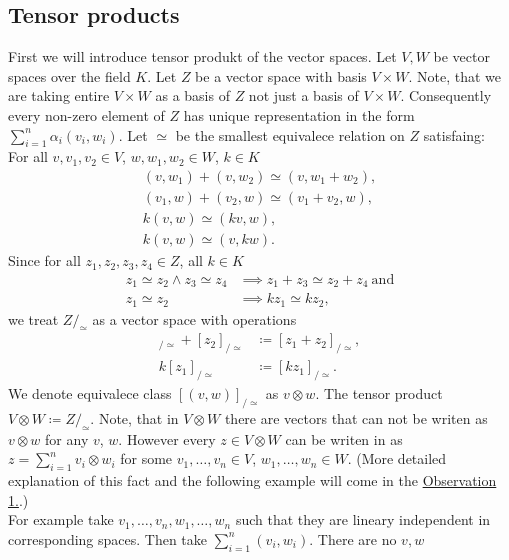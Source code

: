 \documentclass[a4paper]{article}
\begin{document}
\subsection{Tensor products}
%
First we will introduce tensor produkt of the vector spaces. Let $V, W$ be vector spaces over the field $K$.
Let $Z$ be a vector space with basis $V \times W$. Note, that we are taking entire $V \times W$ as a basis
of $Z$ not just a basis of $V \times W$. Consequently every non-zero element of $Z$ has unique
representation in the form
$\displaystyle\sum^n_{i = 1}\alpha_i(v_i,w_i)$.
Let $\simeq$ be the smallest equivalece relation on $Z$ satisfaing: \\
%
For all $v,v_1,v_2 \in V$, $w, w_1, w_2 \in W$, $k \in K$
\begin{gather*}
(v,w_1) + (v, w_2) \simeq (v, w_1 + w_2), \\
(v_1,w) +(v_2, w) \simeq (v_1+v_2,w), \\
k(v, w) \simeq (kv, w), \\
k(v, w) \simeq (v, kw).
\end{gather*}
Since for all $z_1, z_2, z_3, z_4 \in Z$, all $k \in K$
\begin{align*}
z_1 \simeq z_2 \land z_3 \simeq z_4 &\implies z_1 + z_3 \simeq z_2 + z_4 \mathrm{\ and} \\
z_1 \simeq z_2 &\implies kz_1 \simeq kz_2,
\end{align*}
%
we treat $Z/_\simeq$ as a vector space with operations
%
\begin{align*}
[z_1]_{/\simeq} + [z_2]_{/\simeq} &\coloneqq [z_1 + z_2]_{/\simeq}, \\
k[z_1]_{/\simeq} &\coloneqq [kz_1]_{/\simeq}.
\end{align*}
%
We denote equivalece class $[(v,w)]_{/\simeq}$ as $v \otimes w$.
The tensor product $V \otimes W \coloneqq Z/_\simeq$.
Note, that in $V \otimes W$ there are vectors that can not be writen as $v \otimes w$ for any $v$, $w$.
However every $z \in V \otimes W$ can be writen in as $z =\displaystyle\sum^n_{i = 1}v_i \otimes w_i$
for some $v_1, \dots, v_n \in V$, $w_1, \dots, w_n \in W$.
(More detailed explanation of this fact and the following example will come in the
\hyperref[observation:1]{Observation 1.}.)\\
For example take $v_1,\dots, v_n, w_1, \dots, w_n$ such that they are lineary independent
in corresponding spaces.
Then take $\displaystyle\sum^n_{i=1}(v_i,w_i)$. There are no $v, w$
\end{document}
